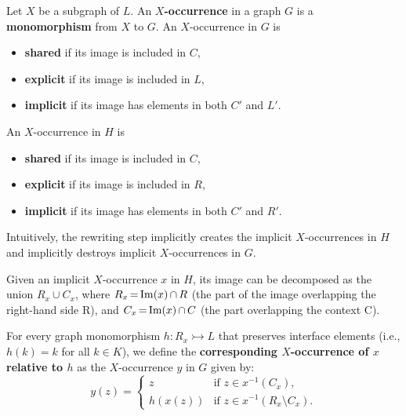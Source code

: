 \begin{definition}
    \label{def:x_occurrence}
     Let $X$ be a subgraph of $L$.  An \textbf{$X$-occurrence} in a graph $G$ is a \textbf{monomorphism} from $X$ to $G$. An $X$-occurrence in $G$ is 
    \begin{itemize}
        \item \textbf{shared} if its image is included in $C$,
        \item \textbf{explicit} if its image is  included in $L$,
        \item \textbf{implicit} if its image has elements in both $C'$ and $L'$.
    \end{itemize}  
    An $X$-occurrence in $H$ is 
    \begin{itemize}
        \item \textbf{shared} if its image is included in $C$,
        \item \textbf{explicit} if its image is included in $R$,
        \item \textbf{implicit} if its image has elements in both $C'$ and $R'$.
    \end{itemize} 

    Intuitively, the rewriting step implicitly creates the implicit $X$-occurrences in $H$ and implicitly destroys implicit $X$-occurrences in $G$. 
    
    Given an implicit $X$-occurrence $x$ in $H$, its image can be decomposed as the union $R_x \mathop{\cup} C_x$, where $R_x \mathop{=} \operatorname{Im}(x) \mathop{\cap} R$ (the part of the image overlapping the right-hand side R), and $C_x \mathop{=} \operatorname{Im}(x) \mathop{\cap} C$ (the part overlapping the context C).
    
    For every graph monomorphism $h : R_x \rightarrowtail L$ that preserves interface elements (i.e., \( h(k) \mathop{=} k \) for all \( k \mathop{\in} K \)), we define the \textbf{corresponding $X$-occurrence of $x$ relative to $h$} as the $X$-occurrence $y$ in $G$ given by:
        $$
        y(z) \mathop{=} 
        \begin{cases}
        z & \text{if } z \mathop{\in} x^{-1}(C_x), \\
        h(x(z)) & \text{if } z \mathop{\in} x^{-1}(R_x \mathop{\setminus} C_x).
        \end{cases}
        $$
   \end{definition} 



